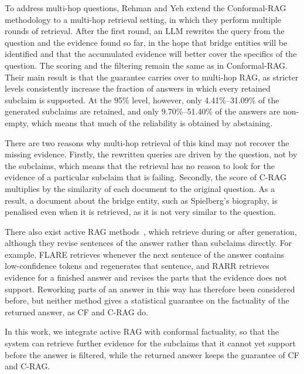 To address multi-hop questions, Rehman and Yeh \cite{rehman2026conformal} extend the Conformal-RAG methodology to a multi-hop retrieval setting, in which they perform multiple rounds of retrieval. After the first round, an LLM rewrites the query from the question and the evidence found so far, in the hope that bridge entities will be identified and that the accumulated evidence will better cover the specifics of the question. The scoring and the filtering remain the same as in Conformal-RAG. Their main result is that the guarantee carries over to multi-hop RAG, as stricter levels consistently increase the fraction of answers in which every retained subclaim is supported. At the 95\% level, however, only 4.41\%--31.09\% of the generated subclaims are retained, and only 9.70\%--51.40\% of the answers are non-empty, which means that much of the reliability is obtained by abstaining. 
 
There are two reasons why multi-hop retrieval of this kind may not recover the missing evidence. Firstly, the rewritten queries are driven by the question, not by the subclaims, which means that the retrieval has no reason to look for the evidence of a particular subclaim that is failing. Secondly, the score of C-RAG multiplies by the similarity of each document to the original question. As a result, a document about the bridge entity, such as Spielberg's biography, is penalised even when it is retrieved, as it is not very similar to the question.

There also exist active RAG methods~\cite{jiang2023active,asai2024selfrag}, which retrieve during or after generation, although they revise sentences of the answer rather than subclaims directly. For example, FLARE \cite{jiang2023active} retrieves whenever the next sentence of the answer contains low-confidence tokens and regenerates that sentence, and RARR \cite{gao2023rarr} retrieves evidence for a finished answer and revises the parts that the evidence does not support. Reworking parts of an answer in this way has therefore been considered before, but neither method gives a statistical guarantee on the factuality of the returned answer, as CF and C-RAG do.

In this work, we integrate active RAG with conformal factuality, so that the system can retrieve further evidence for the subclaims that it cannot yet support before the answer is filtered, while the returned answer keeps the guarantee of CF and C-RAG. 